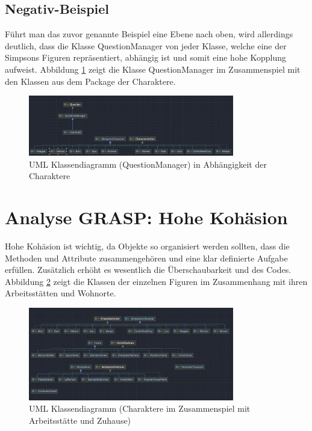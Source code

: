 \subsection{Negativ-Beispiel}
Führt man das zuvor genannte Beispiel eine Ebene nach oben, wird allerdings deutlich, dass die Klasse QuestionManager von jeder Klasse, welche eine der Simpsons Figuren repräsentiert, abhängig ist und somit eine hohe Kopplung aufweist. Abbildung \ref{fig:hoheK} zeigt die Klasse QuestionManager im Zusammenspiel mit den Klassen aus dem Package der Charaktere. 
\begin{figure}[ht]
    \centering
    \includegraphics[width=0.8\textwidth]{Bilder/hoheK.png}
    \caption{UML Klassendiagramm (QuestionManager) in Abhängigkeit der Charaktere}
    \label{fig:hoheK}
\end{figure}

\section{Analyse GRASP: Hohe Kohäsion}
Hohe Kohäsion ist wichtig, da Objekte so organisiert werden sollten, dass die Methoden und Attribute zusammengehören und eine klar definierte Aufgabe erfüllen. Zusätzlich erhöht es wesentlich die Überschaubarkeit und des Codes. Abbildung \ref{fig:highK} zeigt die Klassen der einzelnen Figuren im Zusammenhang mit ihren Arbeitsstätten und Wohnorte.
\begin{figure}[ht]
    \centering
    \includegraphics[width=0.8\textwidth]{Bilder/highK.png}
    \caption{UML Klassendiagramm (Charaktere im Zusammenspiel mit Arbeitsstätte und Zuhause)}
    \label{fig:highK}
\end{figure}
\newpage


